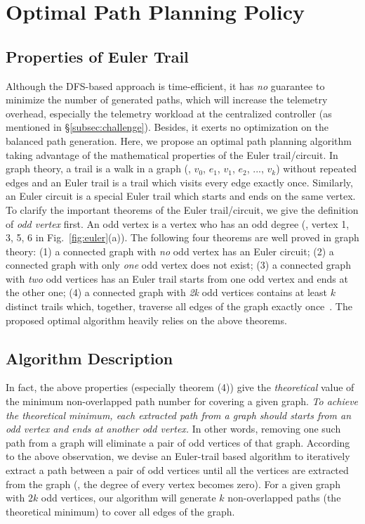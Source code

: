 \section{Optimal Path Planning Policy}
\label{sec:algorithm}

\subsection{Properties of Euler Trail}

Although the DFS-based approach is time-efficient, it has \emph{no} guarantee to minimize the number of generated paths, which will increase the telemetry overhead, especially the telemetry workload at the centralized controller (as mentioned in \S\ref{subsec:challenge}). Besides, it exerts no optimization on the balanced path generation. Here, we propose an optimal path planning algorithm taking advantage of the mathematical properties of the Euler trail/circuit. In graph theory, a trail is a walk in a graph (\eg, $v_0$, $e_1$, $v_1$, $e_2$, ..., $v_k$) without repeated edges and an Euler trail is a trail which visits every edge exactly once. Similarly, an Euler circuit is a special Euler trail which starts and ends on the same vertex. To clarify the important theorems of the Euler trail/circuit, we give the definition of \emph{odd vertex} first. An odd vertex is a vertex who has an odd degree (\eg, vertex 1, 3, 5, 6 in Fig.~\ref{fig:euler}(a)). The following four theorems are well proved in graph theory: (1) a connected graph with \emph{no} odd vertex has an Euler circuit; (2) a connected graph with only \emph{one} odd vertex does not exist; (3) a connected graph with \emph{two} odd vertices has an Euler trail starts from one odd vertex and ends at the other one; (4) a connected graph with \emph{2k} odd vertices contains at least $k$ distinct trails which, together, traverse all edges of the graph exactly once~\cite{bondy1976graph}. The proposed optimal algorithm heavily relies on the above theorems.

\subsection{Algorithm Description}

In fact, the above properties (especially theorem (4)) give the \emph{theoretical} value of the minimum non-overlapped path number for covering a given graph. \emph{To achieve the theoretical minimum, each extracted path from a graph should starts from an odd vertex and ends at another odd vertex.} In other words, removing one such path from a graph will eliminate a pair of odd vertices of that graph. According to the above observation, we devise an Euler-trail based algorithm to iteratively extract a path between a pair of odd vertices until all the vertices are extracted from the graph (\ie, the degree of every vertex becomes zero). For a given graph with $2k$ odd vertices, our algorithm will generate $k$ non-overlapped paths (the theoretical minimum) to cover all edges of the graph. 




